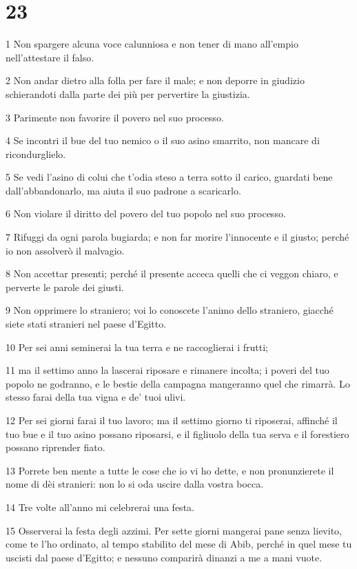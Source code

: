 \chapter{23}

\par 1 Non spargere alcuna voce calunniosa e non tener di mano all'empio nell'attestare il falso.
\par 2 Non andar dietro alla folla per fare il male; e non deporre in giudizio schierandoti dalla parte dei più per pervertire la giustizia.
\par 3 Parimente non favorire il povero nel suo processo.
\par 4 Se incontri il bue del tuo nemico o il suo asino smarrito, non mancare di ricondurglielo.
\par 5 Se vedi l'asino di colui che t'odia steso a terra sotto il carico, guardati bene dall'abbandonarlo, ma aiuta il suo padrone a scaricarlo.
\par 6 Non violare il diritto del povero del tuo popolo nel suo processo.
\par 7 Rifuggi da ogni parola bugiarda; e non far morire l'innocente e il giusto; perché io non assolverò il malvagio.
\par 8 Non accettar presenti; perché il presente acceca quelli che ci veggon chiaro, e perverte le parole dei giusti.
\par 9 Non opprimere lo straniero; voi lo conoscete l'animo dello straniero, giacché siete stati stranieri nel paese d'Egitto.
\par 10 Per sei anni seminerai la tua terra e ne raccoglierai i frutti;
\par 11 ma il settimo anno la lascerai riposare e rimanere incolta; i poveri del tuo popolo ne godranno, e le bestie della campagna mangeranno quel che rimarrà. Lo stesso farai della tua vigna e de' tuoi ulivi.
\par 12 Per sei giorni farai il tuo lavoro; ma il settimo giorno ti riposerai, affinché il tuo bue e il tuo asino possano riposarsi, e il figliuolo della tua serva e il forestiero possano riprender fiato.
\par 13 Porrete ben mente a tutte le cose che io vi ho dette, e non pronunzierete il nome di dèi stranieri: non lo si oda uscire dalla vostra bocca.
\par 14 Tre volte all'anno mi celebrerai una festa.
\par 15 Osserverai la festa degli azzimi. Per sette giorni mangerai pane senza lievito, come te l'ho ordinato, al tempo stabilito del mese di Abib, perché in quel mese tu uscisti dal paese d'Egitto; e nessuno comparirà dinanzi a me a mani vuote.
